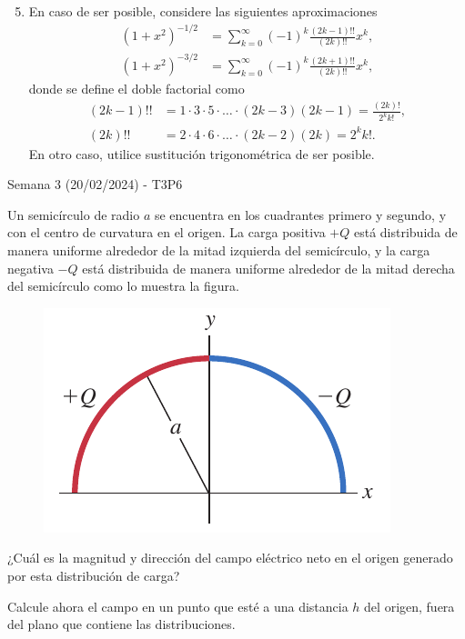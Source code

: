 \begin{frame}{}
    \begin{enumerate}
        \setcounter{enumi}{4}
        \item En caso de ser posible, considere las siguientes aproximaciones
        \begin{equation*}
        \begin{aligned}
            (1+x^2)^{-1/2}&=\sum_{k=0}^\infty (-1)^k\frac{(2k-1)!!}{(2k)!!}x^k,\\
            (1+x^2)^{-3/2}&=\sum_{k=0}^\infty (-1)^k\frac{(2k+1)!!}{(2k)!!}x^k,
        \end{aligned}
        \end{equation*}
        donde se define el doble factorial como 
        \begin{equation*}
            \begin{aligned}
            (2k-1)!!&=1\cdot3\cdot5\cdot\dots\cdot(2k-3)(2k-1)=\frac{(2k)!}{2^kk!},\\
            (2k)!!&=2\cdot4\cdot6\cdot\dots\cdot(2k-2)(2k)=2^kk!.
            \end{aligned}
        \end{equation*}
        En otro caso, utilice sustitución trigonométrica de ser posible.
    \end{enumerate}
\end{frame}

\begin{frame}{Semana 3 (20/02/2024) - T3P6}

Un semicírculo de radio $a$ se encuentra en los cuadrantes primero y segundo, y con el centro de curvatura en el origen. La carga positiva $+Q$ está distribuida de manera uniforme alrededor de la mitad izquierda del semicírculo, y la carga negativa $-Q$ está distribuida de manera uniforme
alrededor de la mitad derecha del semicírculo como lo muestra la figura.

\begin{figure}
    \centering
    \includegraphics[scale=0.3]{figures/t3p6.png}
\end{figure}

¿Cuál es la magnitud y dirección del campo eléctrico neto en el origen generado por esta distribución de carga?

Calcule ahora el campo en un punto que esté a una distancia $h$ del origen, fuera del plano que contiene las distribuciones.
    
\end{frame}

